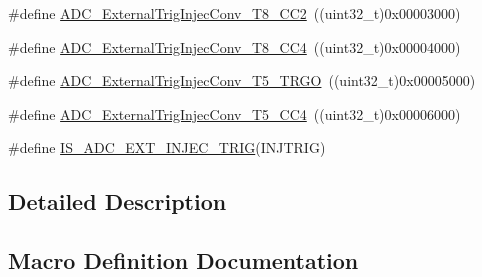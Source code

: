 \begin{DoxyCompactItemize}
\item 
\#define \hyperlink{group___a_d_c__external__trigger__sources__for__injected__channels__conversion_gac0320df9aa5e2d378b05f8e4dcc1616a}{A\+D\+C\+\_\+\+External\+Trig\+Injec\+Conv\+\_\+\+T8\+\_\+\+C\+C2}~((uint32\+\_\+t)0x00003000)
\item 
\#define \hyperlink{group___a_d_c__external__trigger__sources__for__injected__channels__conversion_ga6724679fe75f87c029f268ef47841a3e}{A\+D\+C\+\_\+\+External\+Trig\+Injec\+Conv\+\_\+\+T8\+\_\+\+C\+C4}~((uint32\+\_\+t)0x00004000)
\item 
\#define \hyperlink{group___a_d_c__external__trigger__sources__for__injected__channels__conversion_ga1d92236e9eb9f3adf69371f3f698192e}{A\+D\+C\+\_\+\+External\+Trig\+Injec\+Conv\+\_\+\+T5\+\_\+\+T\+R\+GO}~((uint32\+\_\+t)0x00005000)
\item 
\#define \hyperlink{group___a_d_c__external__trigger__sources__for__injected__channels__conversion_gade68a960ba05714e5f0a1f11a086884e}{A\+D\+C\+\_\+\+External\+Trig\+Injec\+Conv\+\_\+\+T5\+\_\+\+C\+C4}~((uint32\+\_\+t)0x00006000)
\item 
\#define \hyperlink{group___a_d_c__external__trigger__sources__for__injected__channels__conversion_ga3cb8cadbff46e432b5e000c3a7489a0b}{I\+S\+\_\+\+A\+D\+C\+\_\+\+E\+X\+T\+\_\+\+I\+N\+J\+E\+C\+\_\+\+T\+R\+IG}(I\+N\+J\+T\+R\+IG)
\end{DoxyCompactItemize}


\subsection{Detailed Description}


\subsection{Macro Definition Documentation}
\mbox{\label{group___a_d_c__external__trigger__sources__for__injected__channels__conversion_gaa23965b742e08142e5d1c453166dbcc2}} 
